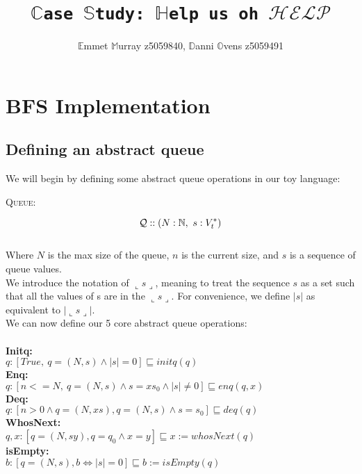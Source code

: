 \documentclass[a4paper]{scrartcl}
\title{\texttt{$\mathbb{C}$ase $\mathbb{S}$tudy: $\mathbb{H}$elp us oh $\mathcal{HELP}$}}
\author{$\mathbb{E}$mmet $\mathbb{M}$urray z5059840, $\mathbb{D}$anni $\mathbb{O}$vens z5059491}
\newcommand{\N}{\mathbb{N}}
\newcommand{\refinedby}{\sqsubseteq} %
\begin{document}
\maketitle
\section{BFS Implementation}
%
\subsection{Defining an abstract queue}
We will begin by defining some abstract queue operations in our toy language: \\
\begin{center}
{\LARGE{\textsc{Queue:}}\normalsize}
\end{center}
\begin{equation*}
\mathcal{Q} :: ( N:\N, ~s:V_{t}^{*} ) \\
\end{equation*} \\
%
Where $N$ is the max size of the queue, $n$ is the current size, and $s$ is a sequence of queue values. \\
%
We introduce the notation of $\llcorner s \lrcorner$, meaning to treat the sequence $s$ as a set such that all the values of s are in the $\llcorner s \lrcorner$. For convenience, we define $|s|$ as equivalent to $|\llcorner s \lrcorner|$.\\
%
We can now define our 5 core abstract queue operations: \\ \\
%
\textbf{Initq:} \\
$q : [True, ~ q = ( N, s) \land |s| = 0] \refinedby initq(q)$ \\
\textbf{Enq:} \\
$q : [n <= N, ~ q = ( N, s) \land s = xs_0 \land |s| \neq 0] \refinedby enq(q, x)$ \\
\textbf{Deq:} \\
$q : [n > 0 \land q = (N, xs), q = (N, s) \land s = s_0 ] \refinedby  deq(q)$ \\
\textbf{WhosNext:} \\
$q,x : [q = (N, sy), q = q_0 \land x = y] \refinedby x := whosNext(q)$ \\
\textbf{isEmpty:} \\
$b : [q = (N, s), b \iff |s| = 0 ] \refinedby b := isEmpty(q)$\\
%
\end{document}
